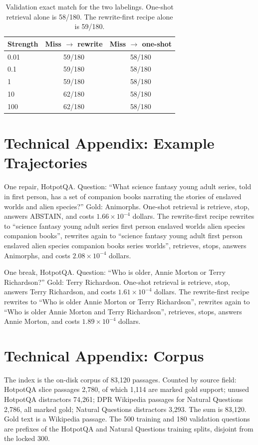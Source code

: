 \documentclass[letterpaper]{article} %
\begin{document}
\begin{table}[t]
\centering
\small
\begin{tabular}{lcc}
\toprule
Strength & Miss \(\to\) rewrite & Miss \(\to\) one-shot \\
\midrule
0.01 & 59/180 & 58/180 \\
0.1 & 59/180 & 58/180 \\
1 & 59/180 & 58/180 \\
10 & 62/180 & 58/180 \\
100 & 62/180 & 58/180 \\
\bottomrule
\end{tabular}
\caption{Validation exact match for the two labelings. One-shot retrieval alone is 58/180. The rewrite-first recipe alone is 59/180.}
\label{tab:grid}
\end{table}

\FloatBarrier
\section{Technical Appendix: Example Trajectories}
One repair, HotpotQA. Question: ``What science fantasy young adult series, told in first person, has a set of companion books narrating the stories of enslaved worlds and alien species?'' Gold: Animorphs. One-shot retrieval is retrieve, stop, answers ABSTAIN, and costs \(1.66\times 10^{-4}\) dollars. The rewrite-first recipe rewrites to ``science fantasy young adult series first person enslaved worlds alien species companion books'', rewrites again to ``science fantasy young adult first person enslaved alien species companion books series worlds'', retrieves, stops, answers Animorphs, and costs \(2.08\times 10^{-4}\) dollars.

One break, HotpotQA. Question: ``Who is older, Annie Morton or Terry Richardson?'' Gold: Terry Richardson. One-shot retrieval is retrieve, stop, answers Terry Richardson, and costs \(1.61\times 10^{-4}\) dollars. The rewrite-first recipe rewrites to ``Who is older Annie Morton or Terry Richardson'', rewrites again to ``Who is older Annie Morton and Terry Richardson'', retrieves, stops, answers Annie Morton, and costs \(1.89\times 10^{-4}\) dollars.

\FloatBarrier
\section{Technical Appendix: Corpus}
The index is the on-disk corpus of 83{,}120 passages. Counted by source field: HotpotQA slice passages 2{,}780, of which 1{,}114 are marked gold support; unused HotpotQA distractors 74{,}261; DPR Wikipedia passages for Natural Questions 2{,}786, all marked gold; Natural Questions distractors 3{,}293. The sum is 83{,}120. Gold text is a Wikipedia passage. The 500 training and 180 validation questions are prefixes of the HotpotQA and Natural Questions training splits, disjoint from the locked 300.
\end{document}
